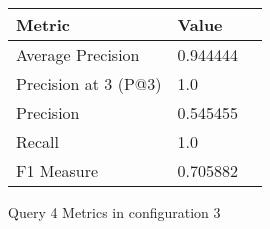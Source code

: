 \begin{figure}[H]
\begin{center}
\begin{tabular}{lll}
\toprule
{}                      Metric &         Value \\
\midrule
     Average Precision &  0.944444 \\
  Precision at 3 (P@3) &       1.0 \\
             Precision &  0.545455 \\
                Recall &       1.0 \\
            F1 Measure &  0.705882 \\
\bottomrule
\end{tabular}
\end{center}
\caption{Query 4 Metrics in configuration 3}
\label{fig:query_4_metrics_config_3}
\end{figure}